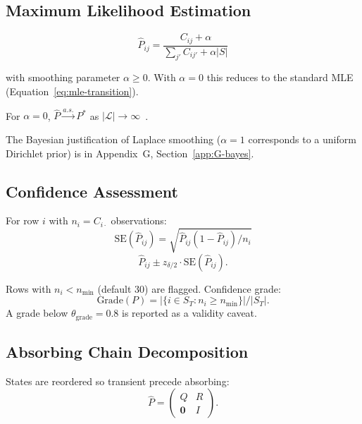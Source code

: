 \subsection{Maximum Likelihood Estimation}
\label{sec:s3-mle}

\begin{equation}
\label{eq:mle-full}
\hat{P}_{ij} = \frac{C_{ij} + \alpha}{\sum_{j'} C_{ij'} + \alpha |S|}
\end{equation}

with smoothing parameter $\alpha \geq 0$. With $\alpha = 0$ this reduces
to the standard MLE (Equation~\ref{eq:mle-transition}).

\begin{property}
\label{prop:mle-consistency}
For $\alpha = 0$, $\hat{P} \xrightarrow{a.s.} P^*$ as $|\mathcal{L}| \to
\infty$~\cite{Spedicato2017}.
\end{property}

The Bayesian justification of Laplace smoothing
($\alpha = 1$ corresponds to a uniform Dirichlet prior) is in
Appendix~G, Section~\ref{app:G-bayes}.


\subsection{Confidence Assessment}
\label{sec:s3-confidence}

For row $i$ with $n_i = C_{i \cdot}$ observations:
\begin{equation}
\label{eq:se-transition}
\text{SE}(\hat{P}_{ij}) = \sqrt{\hat{P}_{ij}(1 - \hat{P}_{ij}) / n_i}
\end{equation}
\begin{equation}
\label{eq:ci-transition}
\hat{P}_{ij} \pm z_{\delta/2} \cdot \text{SE}(\hat{P}_{ij}).
\end{equation}

Rows with $n_i < n_{\min}$ (default 30) are flagged. Confidence grade:
\begin{equation}
\label{eq:confidence-grade}
\text{Grade}(P) = |\{i \in S_T : n_i \geq n_{\min}\}| / |S_T|.
\end{equation}
A grade below $\theta_{\text{grade}} = 0.8$ is reported as a validity
caveat.


\subsection{Absorbing Chain Decomposition}
\label{sec:s3-absorbing}

States are reordered so transient precede absorbing:
\begin{equation}
\label{eq:absorbing-decomposition}
\hat{P} = \begin{pmatrix} Q & R \\ \mathbf{0} & I \end{pmatrix}.
\end{equation}

